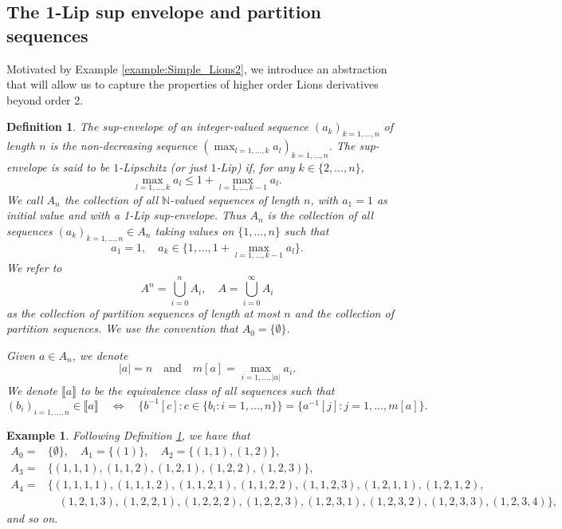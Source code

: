 \documentclass[a4paper,11pt,twoside]{article}
\numberwithin{equation}{section}
\theoremstyle{plain}
\newtheorem{definition}[theorem]{Definition}
\newtheorem{example}[theorem]{Example}
\newcommand{\bN}{\mathbb{N}}
\newcommand{\1}{\mathbbm{1}}
\begin{document}
	\subsection{The 1-Lip sup envelope and partition sequences}
	\label{subsection:1-Lip_sup_envelope}
	
	Motivated by Example \ref{example:Simple_Lions2}, we introduce an abstraction that will allow us to capture the properties of higher order Lions derivatives beyond order 2. 
	
	\begin{definition}
		\label{def:a}
		The sup-envelope of an integer-valued sequence $(a_{k})_{k=1,...,n}$ of length $n$ is the non-decreasing sequence $(\max_{l=1,...,k} a_{l})_{k=1,...,n}$. The sup-envelope is said to be $1$-Lipschitz (or just $1$-Lip) if, for any $k \in \{2,...,n\}$, 
		\begin{equation*}
			\max_{l=1,...,k} a_{l} \leq 1+ \max_{l=1,...,k-1} a_{l}.
		\end{equation*}
		We call $A_{n}$ the collection of all ${\bN}$-valued sequences of length $n$, with $a_{1}=1$ as initial value and with a 1-Lip sup-envelope. Thus $A_n$ is the collection of all sequences $(a_k)_{k=1, ..., n} \in A_n$ taking values on $\{1, ..., n\}$ such that 
		$$
		a_1 = 1, \quad a_k \in \Big\{1, ..., 1+ \max_{l=1, ..., k-1} a_l \Big\}. 
		$$
		We refer to 
		$$
		A^n = \bigcup_{i=0}^n A_i, \quad A = \bigcup_{i=0}^{\infty} A_i
		$$
		as the collection of \emph{partition sequences of length at most $n$} and the collection of \emph{partition sequences}. We use the convention that $A_0 = \{\emptyset\}$. 
		
		Given $a\in A_n$, we denote 
		$$
		|a| = n \quad \mbox{and} \quad m[a] = \max_{i=1, ..., |a|} a_i.
		$$ 
		We denote $\llbracket a\rrbracket$ to be the equivalence class of all sequences such that
		$$
		(b_i)_{i=1, ..., n} \in \llbracket a\rrbracket \quad \iff \quad \Big\{ b^{-1}[c]: c \in \{b_i:i=1, ..., n\} \Big\} = \Big\{ a^{-1}[j]: j=1, ..., m[a] \Big\}. 
		$$ 
	\end{definition}
	
	\begin{example}
		Following Definition \ref{def:a}, we have that
		\begin{align*}
			A_0 =& \Big\{ \emptyset \Big\}, \quad A_1 = \Big\{ (1)\Big\}, \quad A_2 = \Big\{ (1,1), (1,2) \Big\}, 
			\\
			A_3 =& \Big\{ (1,1,1), (1,1,2), (1,2,1), (1,2,2), (1,2,3) \Big\}, 
			\\
			A_4 =& \Big\{ (1,1,1,1), (1,1,1,2), (1,1,2,1), (1,1,2,2), (1,1,2,3), (1,2,1,1), (1,2,1,2), 
			\\
			& \quad (1,2,1,3), (1,2,2,1), (1,2,2,2), (1,2,2,3), (1,2,3,1), (1,2,3,2), (1,2,3,3), (1,2,3,4) \Big\}, 
		\end{align*}
		and so on. 
	\end{example}
	
\end{document}
